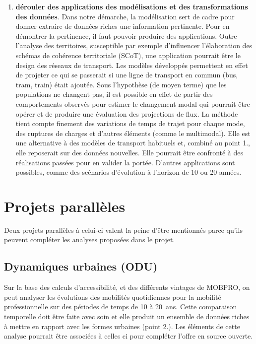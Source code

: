 \documentclass[
  french,
  9pt,
  a4paper,
  DIV=11,
  twoside=semi]{scrreprt}
\begin{document}
\begin{enumerate}
  paradigme des politiques publiques d'aménagement. L'analyse des formes
  urbaines peut également intégrer des éléments du 2. concernant les
  dimensions socio-économiques.
\item
  \textbf{dérouler des applications des modélisations et des
  transformations des données}. Dans notre démarche, la modélisation
  sert de cadre pour donner extraire de données riches une information
  pertinente. Pour en démontrer la pertinence, il faut pouvoir produire
  des applications. Outre l'analyse des territoires, susceptible par
  exemple d'influencer l'élaboration des schémas de cohérence
  territoriale (SCoT), une application pourrait être le design des
  réseaux de transport. Les modèles développés permettent en effet de
  projeter ce qui se passerait si une ligne de transport en commun (bus,
  tram, train) était ajoutée. Sous l'hypothèse (de moyen terme) que les
  populations ne changent pas, il est possible en effet de partir des
  comportements observés pour estimer le changement modal qui pourrait
  être opérer et de produire une évaluation des projections de flux. La
  méthode tient compte finement des variations de temps de trajet pour
  chaque mode, des ruptures de charges et d'autres éléments (comme le
  multimodal). Elle est une alternative à des modèles de transport
  habituels et, combiné au point 1., elle reposerait sur des données
  nouvelles. Elle pourrait être confronté à des réalisations passées
  pour en valider la portée. D'autres applications sont possibles, comme
  des scénarios d'évolution à l'horizon de 10 ou 20 années.
\end{enumerate}

\chapter{Projets parallèles}\label{projets-paralluxe8les}

Deux projets parallèles à celui-ci valent la peine d'être mentionnés
parce qu'ils peuvent compléter les analyses proposées dans le projet.

\section{Dynamiques urbaines (ODU)}\label{dynamiques-urbaines-odu}

Sur la base des calculs d'accessibilité, et des différents vintages de
MOBPRO, on peut analyser les évolutions des mobilités quotidiennes pour
la mobilité professionnelle sur des périodes de temps de 10 à 20~ans.
Cette comparaison temporelle doit être faite avec soin et elle produit
un ensemble de données riches à mettre en rapport avec les formes
urbaines (point 2.). Les éléments de cette analyse pourrait être
associées à celles ci pour compléter l'offre en source ouverte.
\end{document}
